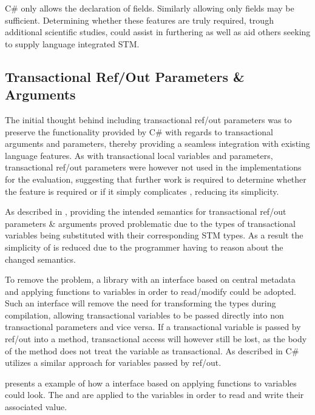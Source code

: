 C\# only allows the declaration of  fields. Similarly allowing only  fields may be sufficient. Determining whether these features are truly required, trough additional scientific studies, could assist in furthering \stmname as well as aid others seeking to supply language integrated \ac{STM}. 

\subsection{Transactional Ref/Out Parameters \& Arguments}\label{subse:reflection_ref_out}
The initial thought behind including transactional ref/out parameters was to preserve the functionality provided by C\# with regards to transactional arguments and parameters, thereby providing a seamless integration with existing language features. As with transactional local variables and parameters, transactional ref/out parameters were however not used in the implementations for the evaluation, suggesting that further work is required to determine whether the feature is required or if it simply complicates \stmname, reducing its simplicity. 

As described in , providing the intended semantics for transactional ref/out parameters \& arguments proved problematic due to the types of transactional variables being substituted with their corresponding \ac{STM} types. As a result the simplicity of \stmname is reduced due to the programmer having to reason about the changed semantics.

To remove the problem, a library with an interface based on central metadata and applying functions to variables in order to read/modify could be adopted. Such an interface will remove the need for transforming the types during compilation, allowing transactional variables to be passed directly into non transactional parameters and vice versa. If a transactional variable is passed by ref/out into a method, transactional access will however still be lost, as the body of the method does not treat the variable as transactional. As described in  C\# utilizes a similar approach for  variables passed by ref/out.

 presents a example of how a  interface based on applying functions to variables could look. The  and  are applied to the  variables in order to read and write their associated value. 

